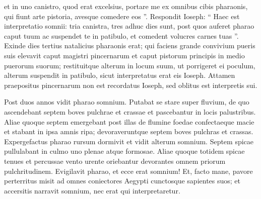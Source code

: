 \begin{biblechapter}
\begin{biblechapter}
\begin{biblechapter}
\begin{biblechapter}
\begin{biblechapter}
\begin{biblechapter}
\begin{biblechapter}
\begin{biblechapter}
\begin{biblechapter}
\begin{biblechapter}
\begin{biblechapter}
\begin{biblechapter}
\begin{biblechapter}
\begin{biblechapter}
\begin{biblechapter}
\begin{biblechapter}
\begin{biblechapter}
\begin{biblechapter}
\begin{biblechapter}
\begin{biblechapter}
\begin{biblechapter}
\begin{biblechapter}
\begin{biblechapter}
\begin{biblechapter}
\begin{biblechapter}
\begin{biblechapter}
\begin{biblechapter}
\begin{biblechapter}
\begin{biblechapter}
\begin{biblechapter}
\begin{biblechapter}
\begin{biblechapter}
\begin{biblechapter}
\begin{biblechapter}
\begin{biblechapter}
\begin{biblechapter}
\begin{biblechapter}
\begin{biblechapter}
\begin{biblechapter}
\begin{biblechapter}
\verse et in uno canistro, quod erat excelsius, portare me ex omnibus cibis pharaonis, qui fiunt arte pistoria, avesque comedere eos ”. 
\verse Respondit Ioseph: “ Haec est interpretatio somnii: tria canistra, tres adhuc dies sunt, 
\verse post quos auferet pharao caput tuum ac suspendet te in patibulo, et comedent volucres carnes tuas ”.
 \verse Exinde dies tertius natalicius pharaonis erat; qui faciens grande convivium pueris suis elevavit caput magistri pincernarum et caput pistorum principis in medio puerorum suorum; 
\verse restituitque alterum in locum suum, ut porrigeret ei poculum, 
\verse alterum suspendit in patibulo, sicut interpretatus erat eis Ioseph.
 \verse Attamen praepositus pincernarum non est recordatus Ioseph, sed oblitus est interpretis sui.
 
\begin{biblechapter}
\verse Post duos annos vidit pharao somnium. Putabat se stare super fluvium, 
 \verse de quo ascendebant septem boves pulchrae et crassae et pascebantur in locis palustribus. 
\verse Aliae quoque septem emergebant post illas de flumine foedae confectaeque macie et stabant in ipsa amnis ripa; 
\verse devoraveruntque septem boves pulchras et crassas. Expergefactus pharao 
\verse rursum dormivit et vidit alterum somnium. Septem spicae pullulabant in culmo uno plenae atque formosae. 
 \verse Aliae quoque totidem spicae tenues et percussae vento urente oriebantur 
\verse devorantes omnem priorum pulchritudinem. Evigilavit pharao, et ecce erat somnium!
 \verse Et, facto mane, pavore perterritus misit ad omnes coniectores Aegypti cunctosque sapientes suos; et accersitis narravit somnium, nec erat qui interpretaretur. 

\end{biblechapter}
\end{biblechapter}
\end{biblechapter}
\end{biblechapter}
\end{biblechapter}
\end{biblechapter}
\end{biblechapter}
\end{biblechapter}
\end{biblechapter}
\end{biblechapter}
\end{biblechapter}
\end{biblechapter}
\end{biblechapter}
\end{biblechapter}
\end{biblechapter}
\end{biblechapter}
\end{biblechapter}
\end{biblechapter}
\end{biblechapter}
\end{biblechapter}
\end{biblechapter}
\end{biblechapter}
\end{biblechapter}
\end{biblechapter}
\end{biblechapter}
\end{biblechapter}
\end{biblechapter}
\end{biblechapter}
\end{biblechapter}
\end{biblechapter}
\end{biblechapter}
\end{biblechapter}
\end{biblechapter}
\end{biblechapter}
\end{biblechapter}
\end{biblechapter}
\end{biblechapter}
\end{biblechapter}
\end{biblechapter}
\end{biblechapter}
\end{biblechapter}
